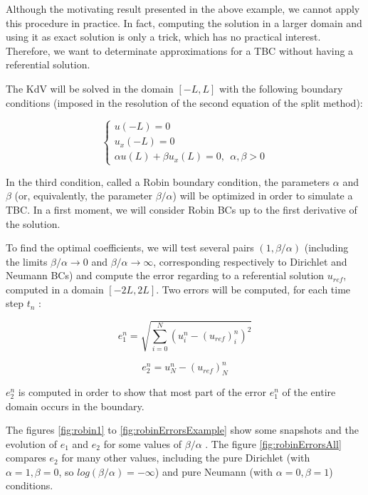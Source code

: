 \indent Although the motivating result presented in the above example, we cannot apply this procedure in practice. In fact, computing the solution in a larger domain and using it as exact solution is only a trick, which has no practical interest. Therefore, we want to determinate approximations for a TBC without having a referential solution. 

\indent The KdV will be solved in the domain $[-L,L]$ with the following boundary conditions (imposed in the resolution of the second equation of the split method):

\begin{equation}
\begin{cases}
    u(-L) = 0 \\
    u_x(-L) = 0 \\
    \alpha u(L) + \beta u_x(L) = 0,  \ \ \alpha,\beta > 0
\end{cases}
\end{equation}

\indent In the third condition, called a Robin boundary condition, the parameters $\alpha$ and $\beta$ (or, equivalently, the parameter $\beta/\alpha$) will be optimized in order to simulate a TBC. In a first moment, we will consider Robin BCs up to the first derivative of the solution.

\indent To find the optimal coefficients, we will test several pairs $(1,\beta/\alpha)$ (including the limits $\beta/\alpha \rightarrow 0$ and $\beta/\alpha \rightarrow \infty$, corresponding respectively to Dirichlet and Neumann BCs) and compute the error regarding to a referential solution $u_{ref}$, computed in a domain $[-2L,2L]$. Two errors will be computed, for each time step $t_n$ :

\begin{equation}
e_1^n = \sqrt{\sum_{i=0}^N{\left( u^n_i - (u_{ref})^n_i\right)^2}} 
\end{equation}

\begin{equation}
e_2^n =  u^n_N - (u_{ref})^n_N
\end{equation}

\indent $e_2^n$ is computed in order to show that most part of the error $e_1^n$ of the entire domain occurs in the boundary.

\indent The figures \ref{fig:robin1} to \ref{fig:robinErrorsExample} show some snapshots and the evolution of $e_1$ and $e_2$ for some values of $\beta/\alpha$ . The figure \ref{fig:robinErrorsAll} compares $e_2$ for many other values, including the pure Dirichlet (with $\alpha = 1, \beta = 0$, so $log(\beta/\alpha) = -\infty$) and pure Neumann (with $\alpha = 0, \beta = 1$)  conditions.


